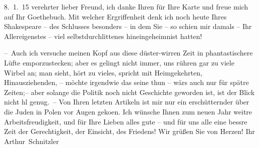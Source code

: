 \pstart
           \raggedleft{}8. 1. 15\pend
           \vspace{0.5em}
\pstart
           verehrter lieber Freund, ich danke Ihren für Ihre Karte und freue
               mich auf Ihr Goethebuch. Mit welcher Ergriffenheit
               denk ich noch heute Ihres Shakespeare – des Schlusses besonders – in dem Sie – so schien mir damals – Ihr
               Allereigenstes – viel selbstdurchlittenes hineingeheimnist hatten!\pend
           
\pstart
           – Auch ich versuche meinen Kopf aus diese düster-wirren Zeit in phantastischere Lüfte
               emporzustecken; aber es gelingt nicht immer, uns rühren gar zu viele Wirbel an; man
               sieht, hört zu vieles, spricht mit Heimgekehrten, Hinausziehenden, – möchte irgendwie
               das seine thun – wärs auch nur für spätre Zeiten;– aber solange die Politik noch
               nicht Geschichte  geworden ist, ist der Blick
               nicht hl {\pb}genug. – Von Ihren letzten Artikeln
               ist mir nur ein erschütternder
               über die Juden in Polen vor Augen geko{\geminationm}en. Ich wünsche Ihnen zum neuen Jahr weitre
               Arbeitsfreudigkeit, und für Ihre Lieben alles gute – und für uns alle eine bessre
               Zeit der Gerechtigkeit, der Einsicht, des Friedens! Wir grüßen Sie von Herzen! Ihr
                  \spacefill\mbox{Arthur Schnitzler}\pend
           \endnumbering{}  \newcommand{\dateiname}{L02202}\newcommand{\titel}{Arthur Schnitzler an Georg Brandes, 8. 1. 1915}\newcommand{\editorInnen}{Martin Anton Müller und Gerd-Hermann Susen}

